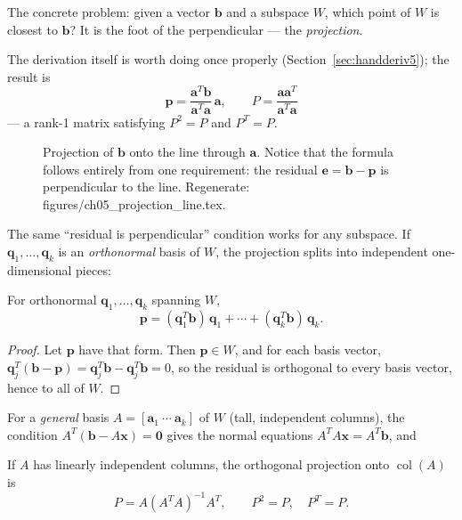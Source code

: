 The concrete problem: given a vector $\mathbf b$ and a subspace $W$, which
point of $W$ is closest to $\mathbf b$? It is the foot of the perpendicular
--- the \emph{projection}.

The derivation itself is worth doing once properly
(Section~\ref{sec:handderiv5}); the result is
\[
\mathbf p=\frac{\mathbf a^{T}\mathbf b}{\mathbf a^{T}\mathbf a}\,\mathbf a,
\qquad
P=\frac{\mathbf a\mathbf a^{T}}{\mathbf a^{T}\mathbf a}
\]
--- a rank-1 matrix satisfying $P^2=P$ and $P^{T}=P$.

\begin{figure}[htbp]
\centering

\caption{Projection of $\mathbf b$ onto the line through $\mathbf a$. Notice
that the formula follows entirely from one requirement: the residual
$\mathbf e=\mathbf b-\mathbf p$ is perpendicular to the line. Regenerate:
\ttfamily figures/ch05\_projection\_line.tex.}
\label{fig:proj-line}
\end{figure}

The same ``residual is perpendicular'' condition works for any subspace.
If $\mathbf q_1,\dots,\mathbf q_k$ is an \emph{orthonormal} basis of $W$, the
projection splits into independent one-dimensional pieces:

\begin{proposition}\label{th:proj-onb}
For orthonormal $\mathbf q_1,\dots,\mathbf q_k$ spanning $W$,
\[
\mathbf p=(\mathbf q_1^{T}\mathbf b)\,\mathbf q_1+\cdots+
(\mathbf q_k^{T}\mathbf b)\,\mathbf q_k .
\]
\end{proposition}

\begin{proof}
Let $\mathbf p$ have that form. Then $\mathbf p\in W$, and for each basis
vector, $\mathbf q_j^{T}(\mathbf b-\mathbf p)
=\mathbf q_j^{T}\mathbf b-\mathbf q_j^{T}\mathbf b=0$, so the residual is
orthogonal to every basis vector, hence to all of $W$.
\end{proof}

For a \emph{general} basis $A=[\mathbf a_1\ \cdots\ \mathbf a_k]$ of $W$
(tall, independent columns), the condition $A^{T}(\mathbf b-A\mathbf x)=\mathbf0$
gives the normal equations $A^{T}A\mathbf x=A^{T}\mathbf b$, and

\begin{theorem}\label{th:proj-matrix}
If $A$ has linearly independent columns, the orthogonal projection onto
$\operatorname{col}(A)$ is
\[
P=A(A^{T}A)^{-1}A^{T},\qquad P^2=P,\quad P^{T}=P .
\]
\end{theorem}

